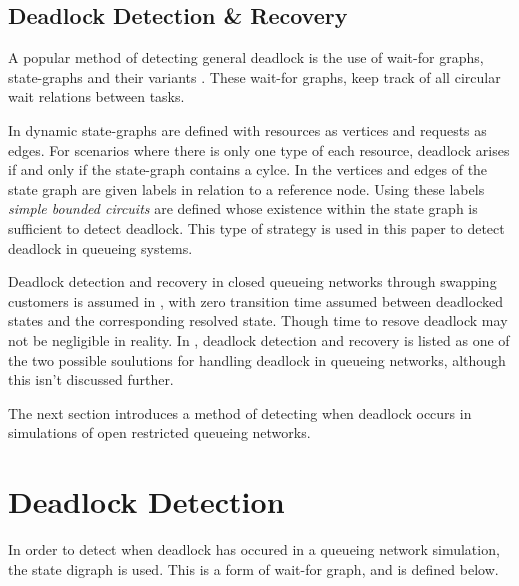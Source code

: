 \documentclass{article}
\numberwithin{equation}{section}
\begin{document}
\subsection{Deadlock Detection \& Recovery}

A popular method of detecting general deadlock is the use of wait-for graphs, state-graphs and their variants \cite{cheng90, elmagarmid86, coffmanelphick71, choetal95}.
These wait-for graphs, keep track of all circular wait relations between tasks.

In \cite{coffmanelphick71} dynamic state-graphs are defined with resources as vertices and requests as edges.
For scenarios where there is only one type of each resource, deadlock arises if and only if the state-graph contains a cylce.
In \cite{choetal95} the vertices and edges of the state graph are given labels in relation to a reference node.
Using these labels \textit{simple bounded circuits} are defined whose existence within the state graph is sufficient to detect deadlock.
This type of strategy is used in this paper to detect deadlock in queueing systems.

Deadlock detection and recovery in closed queueing networks through swapping customers is assumed in \cite{perrosetal88}, with zero transition time assumed between deadlocked states and the corresponding resolved state. Though time to resove deadlock may not be negligible in reality.
In \cite{akyildiz89}, deadlock detection and recovery is listed as one of the two possible soulutions for handling deadlock in queueing networks, although this isn't discussed further.

The next section introduces a method of detecting when deadlock occurs in simulations of open restricted queueing networks.


















\section{Deadlock Detection}\label{sec:detectingdeadlock}

In order to detect when deadlock has occured in a queueing network simulation, the state digraph is used.
This is a form of wait-for graph, and is defined below.\\
\end{document}
